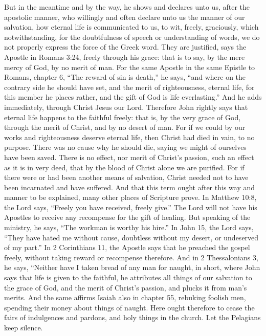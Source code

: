 But in the meantime and by the way, he shows and declares unto us, after the apostolic manner, who willingly and often declare unto us the manner of our salvation, how eternal life is communicated to us, to wit, freely, graciously, which notwithstanding, for the doubtfulness of speech or understanding of words, we do not properly express the force of the Greek word. They are justified, says the Apostle in Romans 3:24, freely through his grace: that is to say, by the mere mercy of God, by no merit of man. For the same Apostle in the same Epistle to Romans, chapter 6, “The reward of sin is death,” he says, “and where on the contrary side he should have set, and the merit of righteousness, eternal life, for this member he places rather, and the gift of God is life everlasting.” And he adds immediately, through Christ Jesus our Lord. Therefore John rightly says that eternal life happens to the faithful freely: that is, by the very grace of God, through the merit of Christ, and by no desert of man. For if we could by our works and righteousness deserve eternal life, then Christ had died in vain, to no purpose. There was no cause why he should die, saying we might of ourselves have been saved. There is no effect, nor merit of Christ’s passion, such an effect as it is in very deed, that by the blood of Christ alone we are purified. For if there were or had been another means of salvation, Christ needed not to have been incarnated and have suffered. And that this term ought after this way and manner to be explained, many other places of Scripture prove. In Matthew 10:8, the Lord says, “Freely you have received, freely give.” The Lord will not have his Apostles to receive any recompense for the gift of healing. But speaking of the ministry, he says, “The workman is worthy his hire.” In John 15, the Lord says, “They have hated me without cause, doubtless without my desert, or undeserved of my part.” In 2 Corinthians 11, the Apostle says that he preached the gospel freely, without taking reward or recompense therefore. And in 2 Thessalonians 3, he says, “Neither have I taken bread of any man for naught, in short, where John says that life is given to the faithful, he attributes all things of our salvation to the grace of God, and the merit of Christ’s passion, and plucks it from man’s merits. And the same affirms Isaiah also in chapter 55, rebuking foolish men, spending their money about things of naught. Here ought therefore to cease the fairs of indulgences and pardons, and holy things in the church. Let the Pelagians keep silence.

